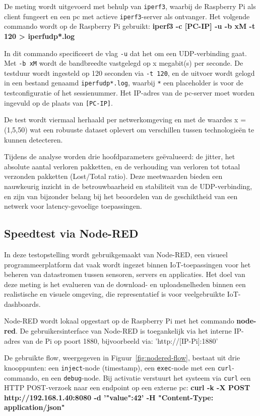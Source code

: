 De meting wordt uitgevoerd met behulp van \texttt{iperf3}, waarbij de Raspberry Pi als client fungeert en een pc met actieve \texttt{iperf3}-server als ontvanger. Het volgende commando wordt op de Raspberry Pi gebruikt: \textbf{iperf3 -c [PC-IP] -u -b xM -t 120 > iperfudp*.log}

In dit commando specificeert de vlag \texttt{-u} dat het om een UDP-verbinding gaat. Met \texttt{-b xM} wordt de bandbreedte vastgelegd op x megabit(s) per seconde. De testduur wordt ingesteld op 120 seconden via \texttt{-t 120}, en de uitvoer wordt gelogd in een bestand genaamd \texttt{iperfudp*.log}, waarbij \texttt{*} een placeholder is voor de testconfiguratie of het sessienummer. Het IP-adres van de pc-server moet worden ingevuld op de plaats van \texttt{[PC-IP]}.

De test wordt viermaal herhaald per netwerkomgeving en met de waardes x = (1,5,50) wat een robuuste dataset oplevert om verschillen tussen technologieën te kunnen detecteren. 

Tijdens de analyse worden drie hoofdparameters geëvalueerd: de jitter, het absolute aantal verloren pakketten, en de verhouding van verloren tot totaal verzonden pakketten (Lost/Total ratio). Deze meetwaarden bieden een nauwkeurig inzicht in de betrouwbaarheid en stabiliteit van de UDP-verbinding, en zijn van bijzonder belang bij het beoordelen van de geschiktheid van een netwerk voor latency-gevoelige toepassingen.


\subsection{Speedtest via Node-RED}
In deze testopstelling wordt gebruikgemaakt van Node-RED, een visueel programmeerplatform dat vaak wordt ingezet binnen IoT-toepassingen voor het beheren van datastromen tussen sensoren, servers en applicaties. Het doel van deze meting is het evalueren van de download- en uploadsnelheden binnen een realistische en visuele omgeving, die representatief is voor veelgebruikte IoT-dashboards.

Node-RED wordt lokaal opgestart op de Raspberry Pi met het commando \textbf{node-red}. De gebruikersinterface van Node-RED is toegankelijk via het interne IP-adres van de Pi op poort 1880, bijvoorbeeld via: 'http://[IP-Pi]:1880'


De gebruikte flow, weergegeven in Figuur~\ref{fig:nodered-flow}, bestaat uit drie knooppunten: een \texttt{inject}-node (timestamp), een \texttt{exec}-node met een \texttt{curl}-commando, en een \texttt{debug}-node. Bij activatie verstuurt het systeem via \texttt{curl} een HTTP POST-verzoek naar een endpoint op een externe pc: \textbf{curl -k -X POST http://192.168.1.40:8080 -d '{"value":42}' -H "Content-Type: application/json"}

